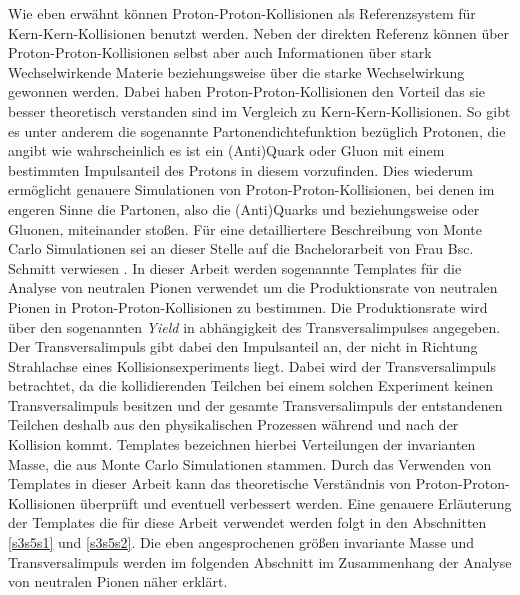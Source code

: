 Wie eben erw\"ahnt k\"onnen Proton-Proton-Kollisionen als Referenzsystem f\"ur Kern-Kern-Kollisionen benutzt werden.
Neben der direkten Referenz k\"onnen \"uber Proton-Proton-Kollisionen selbst aber auch Informationen \"uber stark Wechselwirkende Materie beziehungsweise \"uber die starke Wechselwirkung gewonnen werden.
Dabei haben Proton-Proton-Kollisionen den Vorteil das sie besser theoretisch verstanden sind im Vergleich zu Kern-Kern-Kollisionen.
So gibt es unter anderem die sogenannte Partonendichtefunktion bez\"uglich Protonen, die angibt wie wahrscheinlich es ist ein (Anti)Quark oder Gluon mit einem bestimmten Impulsanteil des Protons in diesem vorzufinden.
Dies wiederum erm\"oglicht genauere Simulationen von Proton-Proton-Kollisionen, bei denen im engeren Sinne die Partonen, also die (Anti)Quarks und beziehungsweise oder Gluonen, miteinander sto{\ss}en.
F\"ur eine detailliertere Beschreibung von Monte Carlo Simulationen sei an dieser Stelle auf die Bachelorarbeit von Frau Bsc. Schmitt verwiesen \cite{thesis:Krissy}.
\newline
In dieser Arbeit werden sogenannte Templates f\"ur die Analyse von neutralen Pionen verwendet um die Produktionsrate von neutralen Pionen in Proton-Proton-Kollisionen zu bestimmen.
Die Produktionsrate wird \"uber den sogenannten \textit{Yield} in abh\"angigkeit des Transversalimpulses angegeben.
Der Transversalimpuls gibt dabei den Impulsanteil an, der nicht in Richtung Strahlachse eines Kollisionsexperiments liegt.
Dabei wird der Transversalimpuls betrachtet, da die kollidierenden Teilchen bei einem solchen Experiment keinen Transversalimpuls besitzen und der gesamte Transversalimpuls der entstandenen Teilchen deshalb aus den physikalischen Prozessen w\"ahrend und nach der Kollision kommt.
\newline
Templates bezeichnen hierbei Verteilungen der invarianten Masse, die aus Monte Carlo Simulationen stammen.
Durch das Verwenden von Templates in dieser Arbeit kann das theoretische Verst\"andnis von Proton-Proton-Kollisionen \"uberpr\"uft und eventuell verbessert werden.
Eine genauere Erl\"auterung der Templates die f\"ur diese Arbeit verwendet werden folgt in den Abschnitten \ref{s3s5s1} und \ref{s3s5s2}.
\newline
Die eben angesprochenen gr{\"o}{\ss}en invariante Masse und Transversalimpuls werden im folgenden Abschnitt im Zusammenhang der Analyse von neutralen Pionen n\"aher erkl\"art. 
